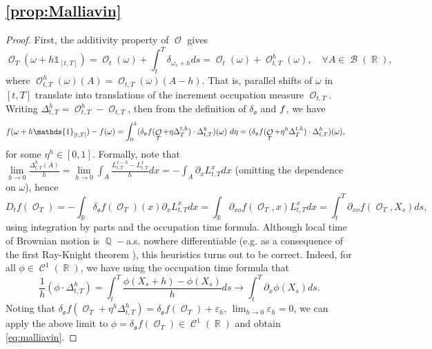 \documentclass[11pt]{article}
\def\mo{\mathfrak{o}}
\theoremstyle{plain}
\theoremstyle{definition}
\DeclareMathOperator{\Q}{\mathbb{Q}}
\DeclareMathOperator{\R}{\mathbb{R}}
\DeclareMathOperator{\calB}{\mathcal{B}}
\DeclareMathOperator{\calC}{\mathcal{C}}
\DeclareMathOperator{\calO}{\mathcal{O}}
\begin{document}
\subsection{\cref{prop:Malliavin}}
\label{app:Malliavin}

\begin{proof}
    First, the additivity property of $\calO$  gives 
    $$\calO_T(\omega + h\mathds{1}_{[t,T]}) = \calO_t(\omega) + \int_t^T \delta_{\omega_s+h}ds = \calO_t(\omega) + \calO_{t,T}^h(\omega), \quad \forall A \in \calB(\R),$$
    where $\calO^h_{t,T}(\omega)(A) = \calO_{t,T}(\omega)(A-h)$. 
    That is,  parallel shifts of $\omega$ in $[t,T]$ translate into   translations of the increment occupation measure $\calO_{t,T}$. 
   Writing $\Delta_{t,T}^{h} = \calO_{t,T}^h - \calO_{t,T}$, then from the definition of $\delta_{\mo}$ and $\textnormal{f}$, we have 
    \begin{align*}
      \textnormal{f}(\omega + h\mathds{1}_{[t,T]}) - \textnormal{f}(\omega) 
        &= \int_0^1  (\delta_{\mo} f(\calO_T + \eta \Delta_{T}^{t,h}) \cdot  \Delta_{t,T}^{h})(\omega)\  d\eta = (\delta_\mo f(\calO_T + \eta^h \Delta_{T}^{t,h}) \cdot  \Delta_{t,T}^{h})(\omega), 
    \end{align*}
    for some $\eta^h\in [0,1]$. 
Formally,   note that 
$\lim\limits_{h \to 0} \frac{\Delta_{t,T}^{h}(A)}{h} = \lim\limits_{h \to 0}\int_A \frac{L^{x-h}_{t,T}-L^{x}_{t,T}}{h}dx = - \int_A \partial_xL_{t,T}^x dx $ (omitting the dependence on $\omega$), 
hence 
\begin{equation*}
    D_{t}f(\calO_T) = - \int_{\R}\delta_\mo f(\calO_T)(x) \partial_xL_{t,T}^x dx = \int_{\R}\partial_{xo} f(\calO_T,x) L_{t,T}^x dx =
    \int_t^T \partial_{xo}f(\calO_T,X_s)ds,
\end{equation*}
using integration by parts and the occupation time formula. 
Although local time of Brownian motion is $\Q-$a.s. nowhere differentiable (e.g. as a consequence of the first Ray-Knight theorem \cite[Chapter XI]{RevuzYor}), 
this heuristics   turns out to be correct. Indeed, 
    for all $\phi \in \calC^1(\R)$, 
     we have using the occupation time formula that 
     $$\frac{1}{h}  (\phi \cdot  \Delta_{t,T}^{h})=  \int_t^T \frac{\phi(X_s+h) - \phi(X_s)}{h} ds \longrightarrow \int_t^T \partial_x \phi(X_s) ds.$$ 
Noting that $ \delta_\mo f(\calO_T + \eta^h \Delta_{t,T}^{h})   =  \delta_\mo  f(\calO_T) +  \varepsilon_h$, $\lim_{h\to 0} \varepsilon_h = 0$, we can apply the above limit to $\phi  = \delta_\mo f(\calO_T)\in \calC^1(\R)$ and obtain \eqref{eq:malliavin}. 
 \end{proof}
\end{document}
